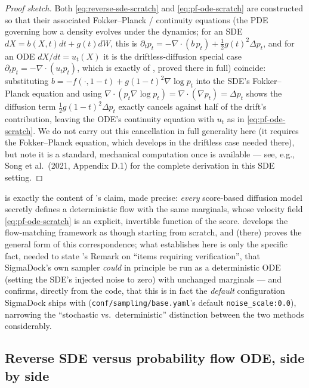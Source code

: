 \documentclass[11pt,a4paper]{report}
\theoremstyle{definition}
\theoremstyle{remark}
\newcommand{\file}[1]{\texttt{#1}}
\begin{document}
\begin{proof}[Proof sketch]
Both \eqref{eq:reverse-sde-scratch} and \eqref{eq:pf-ode-scratch} are
constructed so that their associated Fokker--Planck / continuity equations
(the PDE governing how a density evolves under the dynamics; for an SDE
$dX=b(X,t)dt+g(t)dW$, this is
$\partial_tp_t = -\nabla\cdot(b\,p_t) + \tfrac12g(t)^2\Delta p_t$, and for
an ODE $dX/dt=u_t(X)$ it is the driftless-diffusion special case
$\partial_tp_t=-\nabla\cdot(u_tp_t)$, which is exactly
 of , proved there in full)
coincide: substituting $b=-f(\cdot,1-t)+g(1-t)^2\nabla\log p_t$ into the
SDE's Fokker--Planck equation and using
$\nabla\cdot(p_t\nabla\log p_t)=\nabla\cdot(\nabla p_t)=\Delta p_t$ shows
the diffusion term $\tfrac12g(1-t)^2\Delta p_t$ exactly cancels against
half of the drift's contribution, leaving the ODE's continuity equation
with $u_t$ as in \eqref{eq:pf-ode-scratch}. We do not carry out this
cancellation in full generality here (it requires the Fokker--Planck
equation, which  develops in the driftless case
needed there), but note it is a standard, mechanical computation once
 is available --- see, e.g., Song et al.\ (2021,
Appendix D.1) for the complete derivation in this SDE setting.
\end{proof}

 is exactly the content of
's claim, made precise: \emph{every} score-based diffusion
model secretly defines a deterministic flow with the same marginals, whose
velocity field \eqref{eq:pf-ode-scratch} is an explicit, invertible
function of the score.  develops the
flow-matching framework as though starting from scratch, and
 (there) proves the general form of this correspondence;
what  establishes here is only the specific fact,
needed to state 's Remark on ``items requiring
verification'', that SigmaDock's own sampler \emph{could} in principle be
run as a deterministic ODE (setting the SDE's injected noise to zero) with
unchanged marginals --- and  confirms, directly from
the code, that this is in fact the \emph{default} configuration SigmaDock
ships with (\file{conf/sampling/base.yaml}'s default \texttt{noise\_scale:0.0}),
narrowing the ``stochastic vs.\ deterministic'' distinction between the two
methods considerably.

\subsection{Reverse SDE versus probability flow ODE, side by side}
\label{sec:sde-vs-pfode-table}
\end{document}
